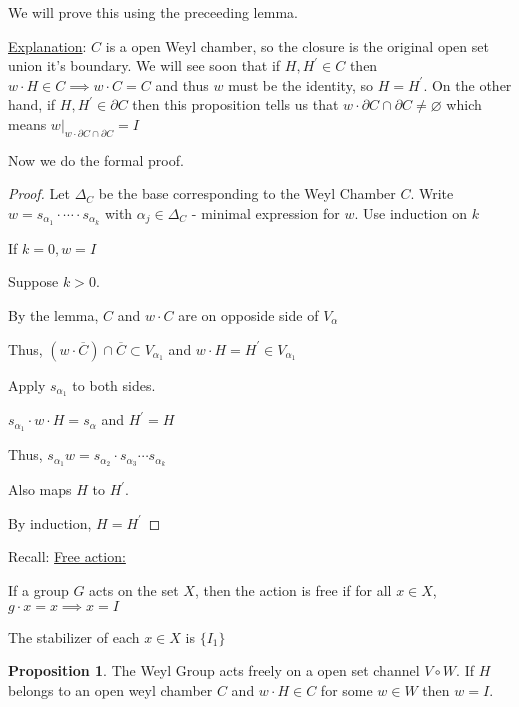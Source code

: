 \documentclass{article}
\theoremstyle{definition}
\newtheorem{proposition}{Proposition}
\begin{document}
We will prove this using the preceeding lemma.

\underline{Explanation}: \(C\) is a open Weyl chamber, so the closure is the original open set union it's boundary. We will see soon that if \(H,H^{\prime} \in C\) then \(w\cdot H \in C \implies w\cdot C = C\) and thus \(w\) must be the identity, so \(H = H^{\prime}\). On the other hand, if \(H,H^{\prime} \in \partial C\) then this proposition tells us that \(w\cdot \partial C\cap \partial C \neq \varnothing\) which means \(w|_{w\cdot \partial C \cap \partial C} = I\)  

Now we do the formal proof.

\begin{proof}
    Let \(\Delta _C\) be the base corresponding to the Weyl Chamber \(C\). Write \(w = s_{\alpha_1}\cdot \cdots \cdot s_{\alpha_k}\) with \(\alpha_j \in \Delta _C\) - minimal expression for \(w\). Use induction on \(k\)
    
    If \(k = 0, w = I\)

    Suppose \(k > 0\).

    By the lemma, \(C\) and \(w\cdot C\) are on opposide side of \(V_\alpha\) 

    Thus, \((w\cdot \overline{C}) \cap \overline{C} \subset V_{\alpha_1}\) and \(w\cdot H = H^{\prime} \in V_{\alpha_1}\) 
    
    Apply \(s_{\alpha_1}\) to both sides.

    \(s_{\alpha_1}\cdot w \cdot H = s_\alpha\) and \(H^{\prime} = H\) 

    Thus, \(s_{\alpha_1}w = s_{\alpha_2}\cdot s_{\alpha_3}\cdots s_{\alpha_k}\)
    
    Also maps \(H\) to \(H^{\prime}\).

    By induction, \(H = H^{\prime}\) 

\end{proof}

Recall: \underline{Free action:}

If a group \(G\) acts on the set \(X\), then the action is free if for all \(x\in X\), \(g\cdot x = x \implies x= I\) 

The stabilizer of each \(x\in X\) is \(\{ I_1  \} \) 

\begin{proposition}
    The Weyl Group acts freely on a open set channel \(V\circ W\). If \(H\) belongs to an open weyl chamber \(C\) and \(w\cdot H \in C\) for some \(w\in W\) then \(w=I\).
\end{proposition}
\end{document}
